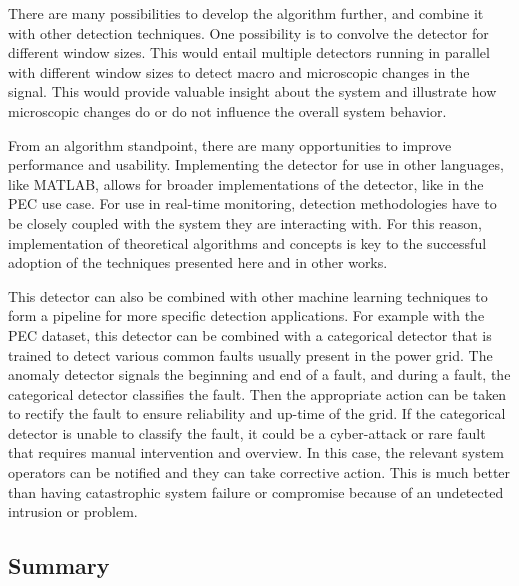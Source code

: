 There are many possibilities to develop the algorithm further, and combine it with other detection techniques. One possibility is to convolve the detector for different window sizes. This would entail multiple detectors running in parallel with different window sizes to detect macro and microscopic changes in the signal. This would provide valuable insight about the system and illustrate how microscopic changes do or do not influence the overall system behavior.

From an algorithm standpoint, there are many opportunities to improve performance and usability. Implementing the detector for use in other languages, like MATLAB, allows for broader implementations of the detector, like in the PEC use case. For use in real-time monitoring, detection methodologies have to be closely coupled with the system they are interacting with. For this reason, implementation of theoretical algorithms and concepts is key to the successful adoption of the techniques presented here and in other works.

This detector can also be combined with other machine learning techniques to form a pipeline for more specific detection applications. For example with the PEC dataset, this detector can be combined with a categorical detector that is trained to detect various common faults usually present in the power grid. The anomaly detector signals the beginning and end of a fault, and during a fault, the categorical detector classifies the fault. Then the appropriate action can be taken to rectify the fault to ensure reliability and up-time of the grid. If the categorical detector is unable to classify the fault, it could be a cyber-attack or rare fault that requires manual intervention and overview. In this case, the relevant system operators can be notified and they can take corrective action. This is much better than having catastrophic system failure or compromise because of an undetected intrusion or problem. 



\subsection{Summary}
